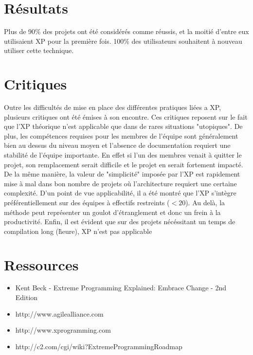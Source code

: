 \documentclass[a4paper,oneside,11pt]{report}
\begin{document}
\section{Résultats}

Plus de 90\% des projets ont été considérés comme réussis, et la moitié d'entre eux utilisaient XP pour la première fois. 100\% des utilisateurs souhaitent à nouveau utiliser cette technique.


\section{Critiques}

Outre les difficultés de mise en place des différentes pratiques liées a XP, plusieurs critiques ont été émises à son encontre. Ces critiques reposent sur le fait que l'XP théorique n'est applicable que dans de rares situations "utopiques". De plus, les compétences requises pour les membres de l'équipe sont généralement bien au dessus du niveau moyen et l'absence de documentation requiert une stabilité de l'équipe importante. En effet si l'un des membres venait à quitter le projet, son remplacement serait difficile et le projet en serait fortement impacté. De la même manière, la valeur de "simplicité" imposée par l'XP est rapidement mise à mal dans bon nombre de projets où l'architecture requiert une certaine complexité. 
D'un point de vue applicabilité, il a été montré que l'XP s'intègre préférentiellement sur des équipes à effectifs restreints ($<20$). Au delà, la méthode peut représenter un goulot d'étranglement et donc un frein à la productivité. Enfin, il est évident que sur des projets nécéssitant un temps de compilation long (\~ heure), XP n'est pas applicable


\section{Ressources}

\begin{itemize}
\item Kent Beck - Extreme Programming Explained: Embrace Change - 2nd Edition
\item http://www.agilealliance.com
\item http://www.xprogramming.com
\item http://c2.com/cgi/wiki?ExtremeProgrammingRoadmap
 \end{itemize}
\end{document}
